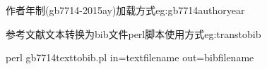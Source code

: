 \begin{example}{作者年制(gb7714-2015ay)加载方式}{eg:gb7714authoryear}
\begin{texlist}
\usepackage[backend=biber,style=gb7714-2015ay]{biblatex}
\usepackage[backend=biber,style=gb7714-2015ay,gbpub=true,gbnoauthor=true]{biblatex}
\end{texlist}
\end{example}

\begin{example}{参考文献文本转换为bib文件perl脚本使用方式}{eg:transtobib}
\begin{texlist}
perl gb7714texttobib.pl in=textfilename out=bibfilename
\end{texlist}
\end{example}

